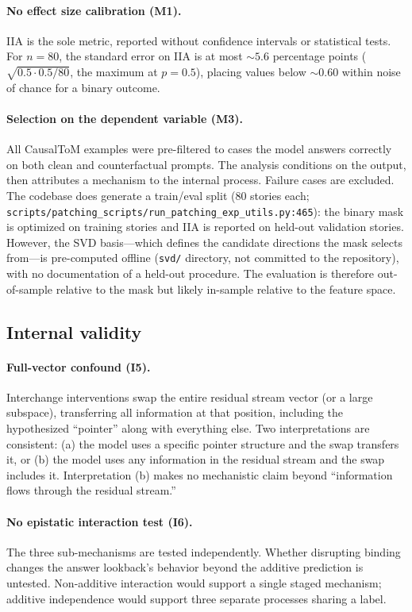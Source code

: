 \documentclass{article}
\begin{document}
\paragraph{No effect size calibration (M1).}
IIA is the sole metric, reported without confidence intervals or statistical tests. For $n = 80$, the standard error on IIA is at most ${\sim}5.6$ percentage points ($\sqrt{0.5 \cdot 0.5 / 80}$, the maximum at $p = 0.5$), placing values below ${\sim}0.60$ within noise of chance for a binary outcome.

\paragraph{Selection on the dependent variable (M3).}
All CausalToM examples were pre-filtered to cases the model answers correctly on both clean and counterfactual prompts. The analysis conditions on the output, then attributes a mechanism to the internal process. Failure cases are excluded. The codebase does generate a train/eval split (80 stories each; \texttt{scripts/patching\_scripts/run\_patching\_exp\_utils.py:465}): the binary mask is optimized on training stories and IIA is reported on held-out validation stories. However, the SVD basis---which defines the candidate directions the mask selects from---is pre-computed offline (\texttt{svd/} directory, not committed to the repository), with no documentation of a held-out procedure. The evaluation is therefore out-of-sample relative to the mask but likely in-sample relative to the feature space.

\subsection{Internal validity}

\paragraph{Full-vector confound (I5).}
Interchange interventions swap the entire residual stream vector (or a large subspace), transferring all information at that position, including the hypothesized ``pointer'' along with everything else. Two interpretations are consistent: (a) the model uses a specific pointer structure and the swap transfers it, or (b) the model uses any information in the residual stream and the swap includes it. Interpretation (b) makes no mechanistic claim beyond ``information flows through the residual stream.''

\paragraph{No epistatic interaction test (I6).}
The three sub-mechanisms are tested independently. Whether disrupting binding changes the answer lookback's behavior beyond the additive prediction is untested. Non-additive interaction would support a single staged mechanism; additive independence would support three separate processes sharing a label.
\end{document}
